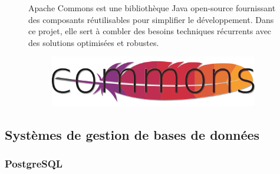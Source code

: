 \documentclass[12pt,a4paper]{report}
\begin{document}
	\begin{figure}[H]
		\begin{minipage}{0.8\textwidth}
			Apache Commons est une bibliothèque Java open-source fournissant des composants réutilisables pour simplifier le développement. Dans ce projet, elle sert à combler des besoins techniques récurrents avec des solutions optimisées et robustes.
		\end{minipage}
		\hfill
		\begin{minipage}{0.15\textwidth} 
			\begin{figure}[H]
				\centering
				\includegraphics[width=\linewidth]{apache-commons-logo.png}
				\label{fig:apache-commons-logo}
			\end{figure}
		\end{minipage}
	\end{figure}
		
	\subsection{Systèmes de gestion de bases de données}
	
	\subsubsection{PostgreSQL}
	
\end{document}
